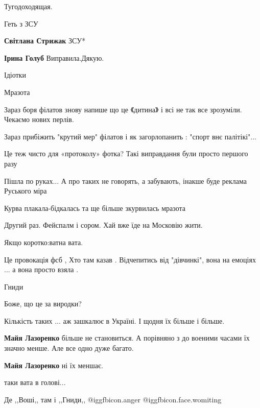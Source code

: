 \begin{itemize}
Тугодоходящая.

Геть з ЗСУ

\begin{itemize} %
\textbf{Світлана Стрижак} ЗСУ*

\textbf{Ірина Голуб} Виправила.Дякую.
\end{itemize} %

Ідіотки

Мразота

Зараз боря філатов знову напише що це 《дитина》 і всі не так все зрозуміли. Чекаємо нових перлів.

Зараз прибіжить "крутий мер" філатов і як загорлопанить : "спорт внє палітікі"...

Це теж чисто для «протоколу» фотка? Такі виправдання були просто першого разу

Пішла по руках... А про таких не говорять, а забувають, інакше буде реклама Руського міра

Курва плакала-бідкалась та ще більше зкурвилась мразота

Другий раз. Фейспалм і сором. Хай вже їде на Московію жити.

Якщо коротко:ватна вата.

Це провокація фсб , Хто там казав . Відчепитись від "дівчинкі", вона на емоціях ... а вона просто взяла .

Гниди

Боже, що це за виродки?

Кількість таких ... аж зашкалює в Україні. І щодня їх більше і більше.

\begin{itemize} %
\textbf{Майя Лазоренко} більше не становиться. А порівняно з до военими часами їх значно менше. Але все одно дуже багато.

\textbf{Майя Лазоренко} ні їх меншає.
\end{itemize} %

таки вата в голові...

Де ,,Воші,, там і ,,Гниди,,  @igg{fbicon.anger}  @igg{fbicon.face.womiting} 


\end{itemize}
